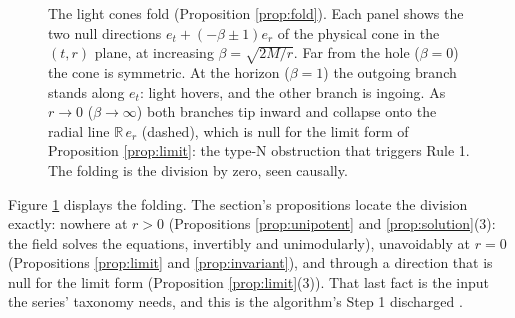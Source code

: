 \documentclass[11pt]{article}
\theoremstyle{definition}
\newcommand{\R}{\mathbb{R}}
\newcommand{\er}{e_r}
\newcommand{\et}{e_t}
\begin{document}
\begin{figure}[t]
\centering
{}
\caption{The light cones fold (Proposition \ref{prop:fold}). Each panel shows the two null directions $\et + (-\beta \pm 1)\er$ of the physical cone in the $(t,r)$ plane, at increasing $\beta = \sqrt{2M/r}$. Far from the hole ($\beta = 0$) the cone is symmetric. At the horizon ($\beta = 1$) the outgoing branch stands along $\et$: light hovers, and the other branch is ingoing. As $r \to 0$ ($\beta \to \infty$) both branches tip inward and collapse onto the radial line $\R\,\er$ (dashed), which is null for the limit form of Proposition \ref{prop:limit}: the type-N obstruction that triggers Rule 1. The folding is the division by zero, seen causally.}
\label{fig:fold}
\end{figure}

Figure \ref{fig:fold} displays the folding. The section's propositions locate the division exactly: nowhere at $r > 0$ (Propositions \ref{prop:unipotent} and \ref{prop:solution}(3): the field solves the equations, invertibly and unimodularly), unavoidably at $r = 0$ (Propositions \ref{prop:limit} and \ref{prop:invariant}), and through a direction that is null for the limit form (Proposition \ref{prop:limit}(3)). That last fact is the input the series' taxonomy needs, and this is the algorithm's Step 1 discharged \cite[\S 8.1, Step 1]{ButlerT1}.
\end{document}
